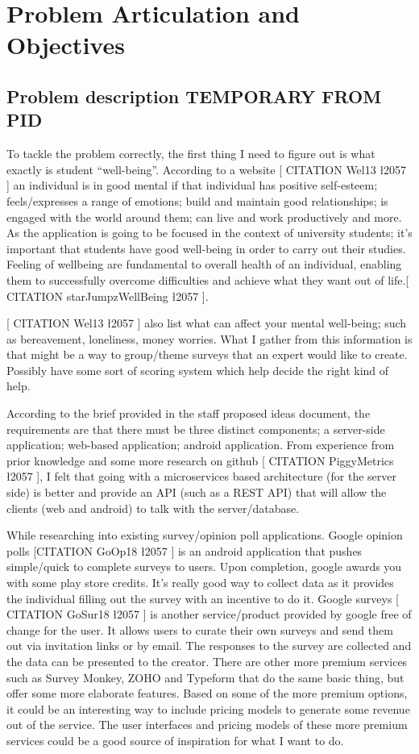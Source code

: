 \section{Problem Articulation and Objectives}

\subsection{Problem description \textbf{TEMPORARY FROM PID}}
To tackle the problem correctly, the first thing I need to figure out is what exactly is student “well-being”. According to a website [ CITATION Wel13 \l 2057 ]  an individual is in good mental if that individual has positive self-esteem; feels/expresses a range of emotions; build and maintain good relationships; is engaged with the world around them; can live and work productively and more. As the application is going to be focused in the context of university students; it’s important that students have good well-being in order to carry out their studies. Feeling of wellbeing are fundamental to overall health of an individual, enabling them to successfully overcome difficulties and achieve what they want out of life.[ CITATION starJumpzWellBeing \l 2057 ].

[ CITATION Wel13 \l 2057 ] also list what can affect your mental well-being; such as bereavement, loneliness, money worries. What I gather from this information is that might be a way to group/theme surveys that an expert would like to create. Possibly have some sort of scoring system which help decide the right kind of help.

According to the brief provided in the staff proposed ideas document, the requirements are that there must be three distinct components; a server-side application; web-based application; android application. From experience from prior knowledge and some more research on github [ CITATION PiggyMetrics \l 2057 ], I felt that going with a microservices based architecture (for the server side) is better and provide an API (such as a REST API) that will allow the clients (web and android) to talk with the server/database. 

While researching into existing survey/opinion poll applications.
Google opinion polls [CITATION GoOp18 \l 2057 ] is an android application that pushes simple/quick to complete surveys to users. Upon completion, google awards you with some play store credits. It’s really good way to collect data as it provides the individual filling out the survey with an incentive to do it.
Google surveys [ CITATION GoSur18 \l 2057 ] is another service/product provided by google free of change for the user. It allows users to curate their own surveys and send them out via invitation links or by email. The responses to the survey are collected and the data can be presented to the creator. There are other more premium services such as Survey Monkey, ZOHO and Typeform that do the same basic thing, but offer some more elaborate features. Based on some of the more premium options, it could be an interesting way to include pricing models to generate some revenue out of the service. The user interfaces and pricing models of these more premium services could be a good source of inspiration for what I want to do. 

